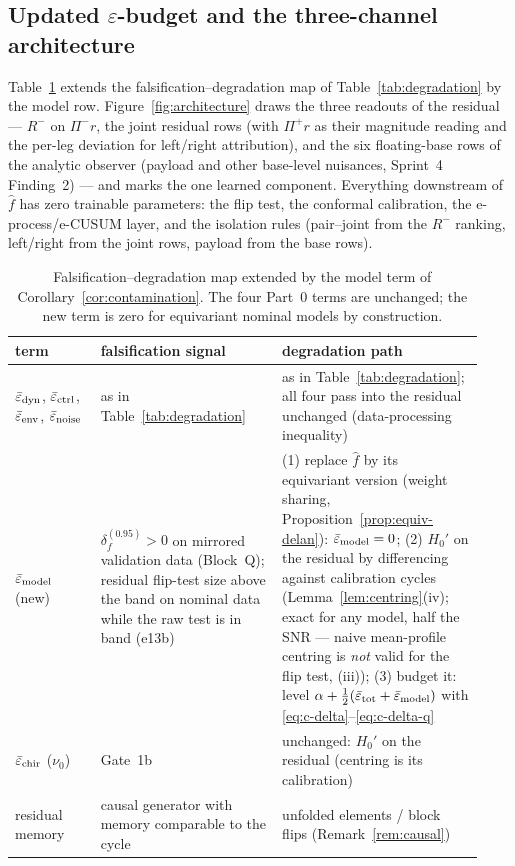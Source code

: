 \subsection{Updated \texorpdfstring{$\varepsilon$}{epsilon}-budget and the three-channel architecture}
\label{sec:p2-budget}

Table~\ref{tab:degradation2} extends the falsification--degradation map of
Table~\ref{tab:degradation} by the model row. Figure~\ref{fig:architecture}
draws the three readouts of the residual --- $R^{-}$ on $\Pi^{-}r$, the
joint residual rows (with $\Pi^{+}r$ as their magnitude reading and the
per-leg deviation for left/right attribution), and the six floating-base
rows of the analytic observer (payload and other base-level nuisances,
Sprint~4 Finding~2) --- and marks the one learned component. Everything
downstream of $\hat f$ has zero trainable parameters: the flip test, the
conformal calibration, the e-process/e-CUSUM layer, and the isolation rules
(pair--joint from the $R^{-}$ ranking, left/right from the joint rows,
payload from the base rows).

\begin{table}[ht]
\centering
\small
\begin{tabular}{@{}p{0.17\linewidth}p{0.36\linewidth}p{0.40\linewidth}@{}}
\toprule
term & falsification signal & degradation path \\
\midrule
$\bar\varepsilon_{\mathrm{dyn}}$, $\bar\varepsilon_{\mathrm{ctrl}}$, $\bar\varepsilon_{\mathrm{env}}$, $\bar\varepsilon_{\mathrm{noise}}$ &
as in Table~\ref{tab:degradation} & as in Table~\ref{tab:degradation};
all four pass into the residual unchanged (data-processing inequality) \\
$\bar\varepsilon_{\mathrm{model}}$ (new) &
$\delta_f^{(0.95)} > 0$ on mirrored validation data (Block~Q); residual
flip-test size above the band on nominal data while the raw test is in band
(e13b) &
(1) replace $\hat f$ by its equivariant version (weight sharing,
Proposition~\ref{prop:equiv-delan}): $\bar\varepsilon_{\mathrm{model}} = 0$;
(2) $H_0'$ on the residual by differencing against calibration cycles
(Lemma~\ref{lem:centring}(iv); exact for any model, half the SNR --- naive
mean-profile centring is \emph{not} valid for the flip test, (iii)); (3) budget it: level
$\alpha + \tfrac12(\bar\varepsilon_{\mathrm{tot}} + \bar\varepsilon_{\mathrm{model}})$ with
\eqref{eq:c-delta}--\eqref{eq:c-delta-q} \\
$\bar\varepsilon_{\mathrm{chir}}$ ($\nu_0$) & Gate~1b & unchanged: $H_0'$ on the residual
(centring is its calibration) \\
residual memory & causal generator with memory comparable to the cycle &
unfolded elements / block flips (Remark~\ref{rem:causal}) \\
\bottomrule
\end{tabular}
\caption{Falsification--degradation map extended by the model term of
Corollary~\ref{cor:contamination}. The four Part~0 terms are unchanged; the
new term is zero for equivariant nominal models by construction.}
\label{tab:degradation2}
\end{table}


